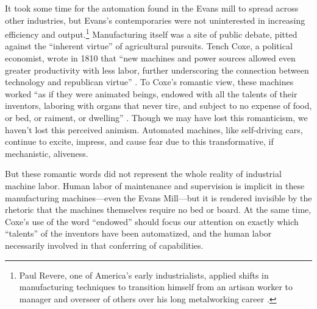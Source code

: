 
It took some time for the automation found in the Evans
mill to spread across other industries, but Evans's contemporaries
were not uninterested in increasing efficiency and output.\footnote{Paul
Revere, one of America's early industrialists, applied shifts in
manufacturing techniques to transition himself from an
artisan worker to manager and overseer of others over his long
metalworking career \cite[p. 187]{martello}.} Manufacturing itself was a site of public
debate, pitted against the ``inherent virtue'' of agricultural pursuits.
Tench Coxe, a political economist, wrote in 1810 that ``new machines
and power sources allowed even greater productivity with less labor,
further underscoring the connection between technology and republican
virtue'' \cite[p. 217]{martello}. To Coxe's romantic view, these machines  worked ``as if they
were animated beings, endowed with all the talents of their inventors,
laboring with organs that never tire, and subject to no expense of
food, or bed, or raiment, or dwelling'' \cite[p. xxv]{coxe}. Though we
may have lost this romanticism, we haven't lost this perceived
animism. Automated machines, like self-driving cars, continue to
excite, impress, and cause fear due to this transformative, if
mechanistic, aliveness.

But these romantic words did not represent the whole reality of
industrial machine labor. Human labor of
maintenance and supervision is implicit in these manufacturing
machines---even the Evans Mill---but it is rendered invisible by the
rhetoric that the 
machines themselves require no bed or board. At the same time, Coxe's
use of the word ``endowed'' should focus our attention on exactly which
``talents'' of the inventors have been automatized, and the human
labor necessarily involved in that conferring of capabilities. 




